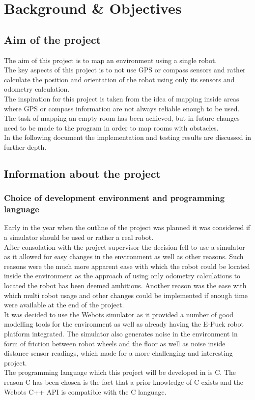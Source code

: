 \chapter{Background \& Objectives}
\label{Background}
\section{Aim of the project}
\label{aim}
The aim of this project is to map an environment using a single robot. \\
The key aspects of this project is to not use GPS or compass sensors and rather calculate the position and orientation of the robot using only its sensors and odometry calculation. \\
The inspiration for this project is taken from the idea of mapping inside areas where GPS or compass information are not always reliable enough to be used. \\[3ex]

The task of mapping an empty room has been achieved, but in future changes need to be made to the program in order to map rooms with obstacles.\\
In the following document the implementation and testing results are discussed in further depth.

\section{Information about the project}
\subsection{Choice of development environment and programming language}
Early in the year when the outline of the project was planned it was considered if a simulator should be used or rather a real robot.\\
After consolation with the project supervisor the decision fell to use a simulator as it allowed for easy changes in the environment as well as other reasons. Such reasons were the much more apparent ease with which the robot could be located inside the environment as the approach of using only odometry calculations to located the robot has been deemed ambitious. Another reason was the ease with which multi robot usage and other changes could be implemented if enough time were available at the end of the project.\\
It was decided to use the Webots\textsuperscript{\texttrademark} simulator as it provided a number of good modelling tools for the environment as well as already having the E-Puck robot platform integrated. The simulator also generates noise in the environment in form of friction between robot wheels and the floor as well as noise inside distance sensor readings, which made for a more challenging and interesting project.\\
The programming language which this project will be developed in is C. The reason C has been chosen is the fact that a prior knowledge of C exists and the Webots\textsuperscript{\texttrademark}  C++ API is compatible with the C language.

